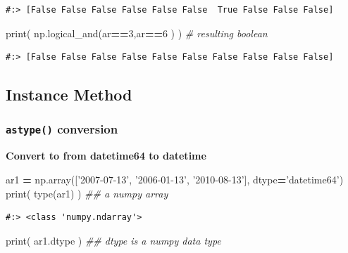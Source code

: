 \documentclass[
]{book}
\newenvironment{Shaded}{\begin{snugshade}}{\end{snugshade}}
\newcommand{\BuiltInTok}[1]{#1}
\newcommand{\CommentTok}[1]{\textcolor[rgb]{0.37,0.37,0.37}{\textit{#1}}}
\newcommand{\DecValTok}[1]{\textcolor[rgb]{0.06,0.06,0.06}{#1}}
\newcommand{\NormalTok}[1]{#1}
\newcommand{\OperatorTok}[1]{\textcolor[rgb]{0.43,0.43,0.43}{\textbf{#1}}}
\newcommand{\StringTok}[1]{\textcolor[rgb]{0.5,0.5,0.5}{#1}}
\begin{document}
\begin{verbatim}
#:> [False False False False False False  True False False False]
\end{verbatim}

\begin{Shaded}
\begin{Highlighting}[]
\BuiltInTok{print}\NormalTok{( np.logical_and(ar}\OperatorTok{==}\DecValTok{3}\NormalTok{,ar}\OperatorTok{==}\DecValTok{6}\NormalTok{ ) )  }\CommentTok{# resulting boolean}
\end{Highlighting}
\end{Shaded}

\begin{verbatim}
#:> [False False False False False False False False False False]
\end{verbatim}

\hypertarget{instance-method-3}{%
\subsection{Instance Method}\label{instance-method-3}}

\hypertarget{astype-conversion}{%
\subsubsection{\texorpdfstring{\texttt{astype()} conversion}{astype() conversion}}\label{astype-conversion}}

\textbf{Convert to from datetime64 to datetime}

\begin{Shaded}
\begin{Highlighting}[]
\NormalTok{ar1 }\OperatorTok{=}\NormalTok{ np.array([}\StringTok{'2007-07-13'}\NormalTok{, }\StringTok{'2006-01-13'}\NormalTok{, }\StringTok{'2010-08-13'}\NormalTok{], dtype}\OperatorTok{=}\StringTok{'datetime64'}\NormalTok{)}
\BuiltInTok{print}\NormalTok{( }\BuiltInTok{type}\NormalTok{(ar1) )  }\CommentTok{## a numpy array}
\end{Highlighting}
\end{Shaded}

\begin{verbatim}
#:> <class 'numpy.ndarray'>
\end{verbatim}

\begin{Shaded}
\begin{Highlighting}[]
\BuiltInTok{print}\NormalTok{( ar1.dtype )  }\CommentTok{## dtype is a numpy data type}
\end{Highlighting}
\end{Shaded}
\end{document}
